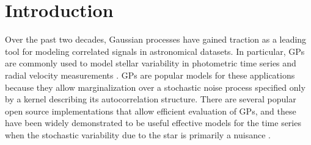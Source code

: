 \documentclass[modern,linenumbers]{aastex62}
\begin{document}
\section{Introduction}
\label{sec:intro-gps}

Over the past two decades, Gaussian processes \citep[GPs;][]{RasmussenWilliams2005} have gained traction as
a leading tool for modeling correlated signals in astronomical datasets.
In particular, GPs are commonly used to model
stellar variability in photometric time series
\citep[e.g.,][]{BrewerStello2009,Aigrain2016,Luger2016,ForemanMackey2017,Angus2018}
and radial velocity measurements \citep[e.g.,][]{Rajpaul2015,Jones2017,Perger2020}.
GPs are popular models for these applications because they allow marginalization
over a stochastic noise process specified only by a kernel describing its autocorrelation structure.
%
There are several popular open source implementations that allow
efficient evaluation of GPs, and these have been widely demonstrated
to be useful effective models for the time series when the stochastic
variability due to the star is primarily a nuisance
\citep[e.g.,][]{Ambikasaran2015,ForemanMackey2017,Gilbertson2020}.

\end{document}
